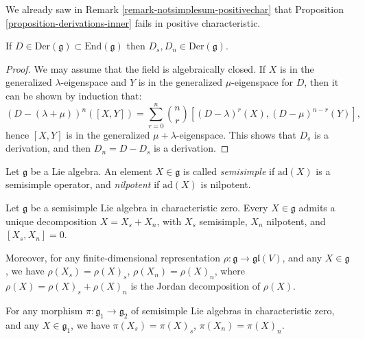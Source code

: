 \begin{remark}
 \label{remark-failure-inner}
 We already saw in Remark \ref{remark-notsimplesum-positivechar} that Proposition \ref{proposition-derivations-inner} fails in positive characteristic.
\end{remark}



\begin{proposition}
\label{proposition-Jordan-derivations}
 If $D\in \text{Der}(\mathfrak g)\subset \text{End}(\mathfrak g)$ then $D_s,D_n\in\text{Der}(\mathfrak g)$.
\end{proposition}

\begin{proof}
We may assume that the field is algebraically closed. 
 If $X$ is in the generalized $\lambda$-eigenspace and $Y$ is in the generalized $\mu$-eigenspace for $D$, then it can be shown by induction that:
$$ (D-(\lambda+\mu))^n([X,Y]) = \sum_{r=0}^n \binom{n}{r} [(D-\lambda)^r(X),(D-\mu)^{n-r}(Y)],$$
hence $[X,Y]$ is in the generalized $\mu+\lambda$-eigenspace. This shows that $D_s$ is a derivation, and then $D_n=D-D_s$ is a derivation.
\end{proof}


\begin{definition}
\label{definition-nilpotent-semisimple-element}
Let $\mathfrak g$ be a Lie algebra. An element $X\in \mathfrak g$ is called \emph{semisimple} if $\text{ad}(X)$ is a semisimple operator, and \emph{nilpotent} if $\text{ad}(X)$ is nilpotent.
\end{definition}

\begin{theorem}
\label{theorem-Jordan-Chevalley}
Let $\mathfrak g$ be a semisimple Lie algebra in characteristic zero. Every $X\in \mathfrak g$ admits a unique decomposition $X=X_s + X_n$, with $X_s$ semisimple, $X_n$ nilpotent, and $[X_s,X_n]=0$.

Moreover, for any finite-dimensional representation $\rho:\mathfrak g \to \mathfrak{gl}(V)$, and any $X\in \mathfrak g$, we have
$\rho(X_s) = \rho(X)_s$, $\rho(X_n)=\rho(X)_n$, where $\rho(X)=\rho(X)_s+\rho(X)_n$ is the Jordan decomposition of $\rho(X)$.

For any morphism $\pi: \mathfrak g_1 \to \mathfrak g_2$ of semisimple Lie algebras in characteristic zero, and any $X\in \mathfrak g_1$, we have $\pi(X_s) = \pi(X)_s$, $\pi(X_n)=\pi(X)_n$.
\end{theorem}


